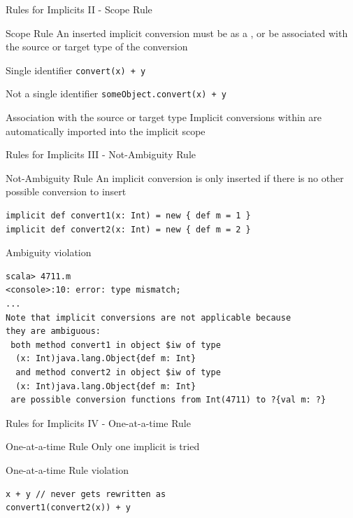 \begin{frame}[fragile]{Rules for Implicits II - Scope Rule}
\begin{block}{Scope Rule}
An inserted implicit conversion must be  as a
, or be associated with the source or target type
of the conversion
\end{block}
\begin{exampleblock}{Single identifier}
\lstinline!convert(x) + y!
\end{exampleblock}
\begin{alertblock}{Not a single identifier}
\lstinline!someObject.convert(x) + y!
\end{alertblock}
\begin{block}{Association with the source or target type}
Implicit conversions within  are automatically
imported into the implicit scope
\end{block}
\end{frame}

\begin{frame}[fragile]{Rules for Implicits III - Not-Ambiguity Rule}
\begin{block}{Not-Ambiguity Rule}
An implicit conversion is only inserted if there is no other possible conversion
to insert
\end{block}
\begin{lstlisting}
implicit def convert1(x: Int) = new { def m = 1 }
implicit def convert2(x: Int) = new { def m = 2 }
\end{lstlisting}
\begin{alertblock}{Ambiguity violation}
\begin{lstlisting}
scala> 4711.m
<console>:10: error: type mismatch;
...
Note that implicit conversions are not applicable because
they are ambiguous:
 both method convert1 in object $iw of type
  (x: Int)java.lang.Object{def m: Int}
  and method convert2 in object $iw of type
  (x: Int)java.lang.Object{def m: Int}
 are possible conversion functions from Int(4711) to ?{val m: ?}
\end{lstlisting}
\end{alertblock}
\end{frame}

\begin{frame}[fragile]{Rules for Implicits IV - One-at-a-time Rule}
\begin{block}{One-at-a-time Rule}
Only one implicit is tried
\end{block}
\begin{alertblock}{One-at-a-time Rule violation}
\begin{lstlisting}
x + y // never gets rewritten as
convert1(convert2(x)) + y
\end{lstlisting}
\end{alertblock}
\end{frame}

